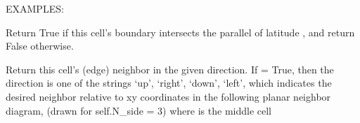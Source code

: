 \documentclass[a4paper,12ptopenany,oneside,english]{sphinxmanual}
\begin{document}
\begin{fulllineitems}
\begin{fulllineitems}
\sphinxAtStartPar
EXAMPLES:

\begin{sphinxVerbatim}[commandchars=\\\{\}]
  
  \PYG{p}{[} \PYG{p}{]}
\end{sphinxVerbatim}

\end{fulllineitems}


\begin{fulllineitems}
\label{\detokenize{dggs:rhealpixdggs.dggs.Cell.intersects_parallel}}
\pysigstartsignatures
{}
\pysigstopsignatures
\sphinxAtStartPar
Return True if this cell’s boundary intersects the parallel of latitude
, and return False otherwise.

\end{fulllineitems}


\begin{fulllineitems}
\label{\detokenize{dggs:rhealpixdggs.dggs.Cell.neighbor}}
\pysigstartsignatures
{}
\pysigstopsignatures
\sphinxAtStartPar
Return this cell’s (edge) neighbor in the given direction.
If  = True, then the direction is one of the strings
‘up’, ‘right’, ‘down’, ‘left’, which indicates the desired neighbor
relative to x\sphinxhyphen{}y coordinates
in the following planar neighbor diagram, (drawn for self.N\_side = 3)
where  is the middle cell


\end{fulllineitems}
\end{fulllineitems}
\end{document}
